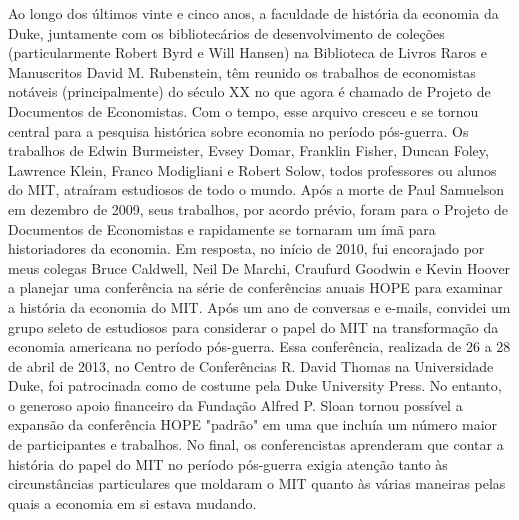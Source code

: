 \documentclass[a4paper,12pt]{article}[abntex2]
\begin{document}
Ao longo dos últimos vinte e cinco anos, a faculdade de história da economia da Duke, juntamente com os bibliotecários de desenvolvimento de coleções (particularmente Robert Byrd e Will Hansen) na Biblioteca de Livros Raros e Manuscritos David M. Rubenstein, têm reunido os trabalhos de economistas notáveis (principalmente) do século XX no que agora é chamado de Projeto de Documentos de Economistas. Com o tempo, esse arquivo cresceu e se tornou central para a pesquisa histórica sobre economia no período pós-guerra. Os trabalhos de Edwin Burmeister, Evsey Domar, Franklin Fisher, Duncan Foley, Lawrence Klein, Franco Modigliani e Robert Solow, todos professores ou alunos do MIT, atraíram estudiosos de todo o mundo. Após a morte de Paul Samuelson em dezembro de 2009, seus trabalhos, por acordo prévio, foram para o Projeto de Documentos de Economistas e rapidamente se tornaram um ímã para historiadores da economia. Em resposta, no início de 2010, fui encorajado por meus colegas Bruce Caldwell, Neil De Marchi, Craufurd Goodwin e Kevin Hoover a planejar uma conferência na série de conferências anuais HOPE para examinar a história da economia do MIT. Após um ano de conversas e e-mails, convidei um grupo seleto de estudiosos para considerar o papel do MIT na transformação da economia americana no período pós-guerra. Essa conferência, realizada de 26 a 28 de abril de 2013, no Centro de Conferências R. David Thomas na Universidade Duke, foi patrocinada como de costume pela Duke University Press. No entanto, o generoso apoio financeiro da Fundação Alfred P. Sloan tornou possível a expansão da conferência HOPE "padrão" em uma que incluía um número maior de participantes e trabalhos. No final, os conferencistas aprenderam que contar a história do papel do MIT no período pós-guerra exigia atenção tanto às circunstâncias particulares que moldaram o MIT quanto às várias maneiras pelas quais a economia em si estava mudando.
\end{document}
